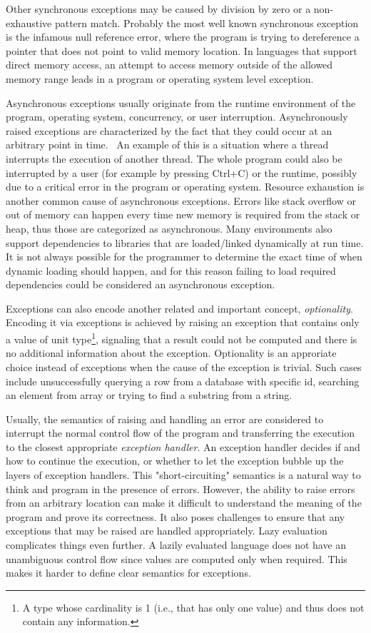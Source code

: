 Other synchronous exceptions may be caused by division by zero or a non-exhaustive pattern match. Probably the most well known synchronous exception is the infamous null reference error, where the program is trying to dereference a pointer that does not point to valid memory location. In languages that support direct memory access, an attempt to access memory outside of the allowed memory range leads in a program or operating system level exception.~\cite{akward-squad}

Asynchronous exceptions usually originate from the runtime environment of the program, operating system, concurrency, or user interruption. Asynchronously raised exceptions are characterized by the fact that they could occur at an arbitrary point in time.~\cite{async-exc} An example of this is a situation where a thread interrupts the execution of another thread. The whole program could also be interrupted by a user (for example by pressing Ctrl+C) or the runtime, possibly due to a critical error in the program or operating system. Resource exhaustion is another common cause of asynchronous exceptions. Errors like stack overflow or out of memory can happen every time new memory is required from the stack or heap, thus those are categorized as asynchronous. Many environments also support dependencies to libraries that are loaded/linked  dynamically at run time. It is not always possible for the programmer to determine the exact time of when dynamic loading should happen, and for this reason failing to load required dependencies could be considered an asynchronous exception.~\cite{akward-squad}

Exceptions can also encode another related and important concept, \textit{optionality}. Encoding it via exceptions is achieved by raising an exception that contains only a value of unit type\footnote{A type whose cardinality is 1 (i.e., that has only one value) and thus does not contain any information.}, signaling that a result could not be computed and there is no additional information about the exception. Optionality is an approriate choice instead of exceptions when the cause of the exception is trivial. Such cases include unsuccessfully querying a row from a database with specific id, searching an element from array or trying to find a substring from a string.

Usually, the semantics of raising and handling an error are considered to interrupt the normal control flow of the program and transferring the execution to the closest appropriate \textit{exception handler}. An exception handler decides if and how to continue the execution, or whether to let the exception bubble up the layers of exception handlers. This "short-circuiting" semantics is a natural way to think and program in the presence of errors. However, the ability to raise errors from an arbitrary location can make it difficult to understand the meaning of the program and prove its correctness. It also poses challenges to ensure that any exceptions that may be raised are handled appropriately. Lazy evaluation complicates things even further. A lazily evaluated language does not have an unambiguous control flow since values are computed only when required. This makes it harder to define clear semantics for exceptions.~\cite{imprecise-exceptions}


